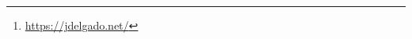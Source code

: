 \author{
    Jonathan Delgado\footnote{\url{https://jdelgado.net/}} \\
    \href{mailto:jonathan.delgado@uci.edu}{jonathan.delgado@uci.edu} 
}

\maketitle

% 

\printtableofcontents


% 
% 


\clearpage {} \setcounter{page}{1}
